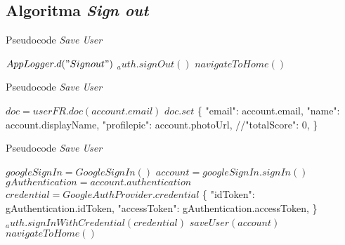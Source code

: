 \subsection{Algoritma \textit{Sign out}}
\begin{algorithm}[H]
    \caption{Pseudocode \textit{Save User}}
    \begin{algorithmic}
          \State $AppLogger.d("Sign out")$
            \State $_auth.signOut()$
            \State $navigateToHome()$
        \EndFunction
    \end{algorithmic}
\end{algorithm}

\begin{algorithm}[H]
    \caption{Pseudocode \textit{Save User}}
    \begin{algorithmic}
        \State $doc = userFR.doc(account.email)$
        \State $doc.set$ \{
            "email": account.email,
            "name": account.displayName,
            "profilepic": account.photoUrl,
            //"totalScore": 0,
        \}
        \EndFunction
    \end{algorithmic}
\end{algorithm}
\begin{algorithm}[H]
    \caption{Pseudocode \textit{Save User}}
    \begin{algorithmic}
          \State $googleSignIn = GoogleSignIn()$
            \State $account = googleSignIn.signIn()$
              \State $gAuthentication = account.authentication$
              \State $credential = GoogleAuthProvider.credential$ \{
                "idToken": gAuthentication.idToken,
                "accessToken": gAuthentication.accessToken,
              \}
              \State $_auth.signInWithCredential(credential)$
              \State $saveUser(account)$
              \State $navigateToHome()$
            \EndIf
        \EndFunction
    \end{algorithmic}
\end{algorithm}
